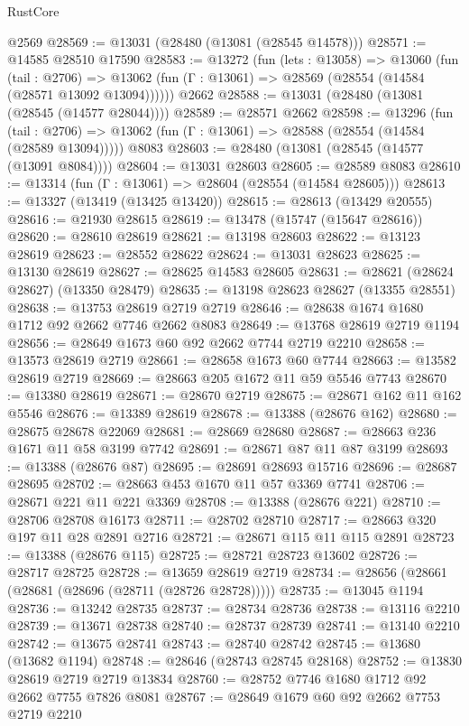 \begin{lexlean}{RustCore}
\begin{coremodule}
    @2569
@28569 := @13031 (@28480 (@13081 (@28545 @14578)))
@28571 := @14585 @28510 @17590
@28583 := @13272
    (fun (lets : @13058) =>
    @13060
      (fun (tail : @2706) =>
      @13062 (fun (Γ : @13061) => @28569 (@28554 (@14584 (@28571 @13092 @13094))))))
    @2662
@28588 := @13031 (@28480 (@13081 (@28545 (@14577 @28044))))
@28589 := @28571 @2662
@28598 := @13296
    (fun (tail : @2706) => @13062 (fun (Γ : @13061) => @28588 (@28554 (@14584 (@28589 @13094)))))
    @8083
@28603 := @28480 (@13081 (@28545 (@14577 (@13091 @8084))))
@28604 := @13031 @28603
@28605 := @28589 @8083
@28610 := @13314 (fun (Γ : @13061) => @28604 (@28554 (@14584 @28605)))
@28613 := @13327 (@13419 (@13425 @13420))
@28615 := @28613 (@13429 @20555)
@28616 := @21930 @28615
@28619 := @13478 (@15747 (@15647 @28616))
@28620 := @28610 @28619
@28621 := @13198 @28603
@28622 := @13123 @28619
@28623 := @28552 @28622
@28624 := @13031 @28623
@28625 := @13130 @28619
@28627 := @28625 @14583 @28605
@28631 := @28621 (@28624 @28627) (@13350 @28479)
@28635 := @13198 @28623 @28627 (@13355 @28551)
@28638 := @13753 @28619 @2719 @2719
@28646 := @28638 @1674 @1680 @1712 @92 @2662 @7746 @2662 @8083
@28649 := @13768 @28619 @2719 @1194
@28656 := @28649 @1673 @60 @92 @2662 @7744 @2719 @2210
@28658 := @13573 @28619 @2719
@28661 := @28658 @1673 @60 @7744
@28663 := @13582 @28619 @2719
@28669 := @28663 @205 @1672 @11 @59 @5546 @7743
@28670 := @13380 @28619
@28671 := @28670 @2719
@28675 := @28671 @162 @11 @162 @5546
@28676 := @13389 @28619
@28678 := @13388 (@28676 @162)
@28680 := @28675 @28678 @22069
@28681 := @28669 @28680
@28687 := @28663 @236 @1671 @11 @58 @3199 @7742
@28691 := @28671 @87 @11 @87 @3199
@28693 := @13388 (@28676 @87)
@28695 := @28691 @28693 @15716
@28696 := @28687 @28695
@28702 := @28663 @453 @1670 @11 @57 @3369 @7741
@28706 := @28671 @221 @11 @221 @3369
@28708 := @13388 (@28676 @221)
@28710 := @28706 @28708 @16173
@28711 := @28702 @28710
@28717 := @28663 @320 @197 @11 @28 @2891 @2716
@28721 := @28671 @115 @11 @115 @2891
@28723 := @13388 (@28676 @115)
@28725 := @28721 @28723 @13602
@28726 := @28717 @28725
@28728 := @13659 @28619 @2719
@28734 := @28656 (@28661 (@28681 (@28696 (@28711 (@28726 @28728)))))
@28735 := @13045 @1194
@28736 := @13242 @28735
@28737 := @28734 @28736
@28738 := @13116 @2210
@28739 := @13671 @28738
@28740 := @28737 @28739
@28741 := @13140 @2210
@28742 := @13675 @28741
@28743 := @28740 @28742
@28745 := @13680 (@13682 @1194)
@28748 := @28646 (@28743 @28745 @28168)
@28752 := @13830 @28619 @2719 @2719 @13834
@28760 := @28752 @7746 @1680 @1712 @92 @2662 @7755 @7826 @8081
@28767 := @28649 @1679 @60 @92 @2662 @7753 @2719 @2210

\end{coremodule}
\end{lexlean}
